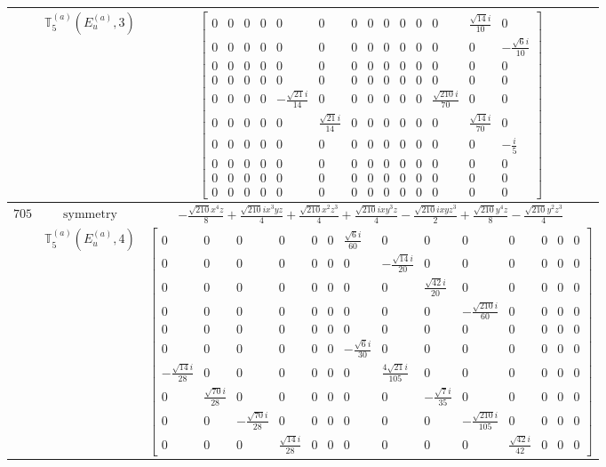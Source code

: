 \documentclass[fleqn,8pt,landscape]{jsarticle}
\begin{document}
\begin{longtable}{ccc}
$  $ & $ \mathbb{T}_{5}^{(a)}(E_{u}^{(a)},3) $ & $ \begin{bmatrix} 0 & 0 & 0 & 0 & 0 & 0 & 0 & 0 & 0 & 0 & 0 & 0 & \frac{\sqrt{14} i}{10} & 0 \\ 0 & 0 & 0 & 0 & 0 & 0 & 0 & 0 & 0 & 0 & 0 & 0 & 0 & - \frac{\sqrt{6} i}{10} \\ 0 & 0 & 0 & 0 & 0 & 0 & 0 & 0 & 0 & 0 & 0 & 0 & 0 & 0 \\ 0 & 0 & 0 & 0 & 0 & 0 & 0 & 0 & 0 & 0 & 0 & 0 & 0 & 0 \\ 0 & 0 & 0 & 0 & - \frac{\sqrt{21} i}{14} & 0 & 0 & 0 & 0 & 0 & 0 & \frac{\sqrt{210} i}{70} & 0 & 0 \\ 0 & 0 & 0 & 0 & 0 & \frac{\sqrt{21} i}{14} & 0 & 0 & 0 & 0 & 0 & 0 & \frac{\sqrt{14} i}{70} & 0 \\ 0 & 0 & 0 & 0 & 0 & 0 & 0 & 0 & 0 & 0 & 0 & 0 & 0 & - \frac{i}{5} \\ 0 & 0 & 0 & 0 & 0 & 0 & 0 & 0 & 0 & 0 & 0 & 0 & 0 & 0 \\ 0 & 0 & 0 & 0 & 0 & 0 & 0 & 0 & 0 & 0 & 0 & 0 & 0 & 0 \\ 0 & 0 & 0 & 0 & 0 & 0 & 0 & 0 & 0 & 0 & 0 & 0 & 0 & 0 \end{bmatrix} $ \\ \hline
$ 705 $ & $ \text{symmetry} $ & $ - \frac{\sqrt{210} x^{4} z}{8} + \frac{\sqrt{210} i x^{3} y z}{4} + \frac{\sqrt{210} x^{2} z^{3}}{4} + \frac{\sqrt{210} i x y^{3} z}{4} - \frac{\sqrt{210} i x y z^{3}}{2} + \frac{\sqrt{210} y^{4} z}{8} - \frac{\sqrt{210} y^{2} z^{3}}{4} $ \\
$  $ & $ \mathbb{T}_{5}^{(a)}(E_{u}^{(a)},4) $ & $ \begin{bmatrix} 0 & 0 & 0 & 0 & 0 & 0 & \frac{\sqrt{6} i}{60} & 0 & 0 & 0 & 0 & 0 & 0 & 0 \\ 0 & 0 & 0 & 0 & 0 & 0 & 0 & - \frac{\sqrt{14} i}{20} & 0 & 0 & 0 & 0 & 0 & 0 \\ 0 & 0 & 0 & 0 & 0 & 0 & 0 & 0 & \frac{\sqrt{42} i}{20} & 0 & 0 & 0 & 0 & 0 \\ 0 & 0 & 0 & 0 & 0 & 0 & 0 & 0 & 0 & - \frac{\sqrt{210} i}{60} & 0 & 0 & 0 & 0 \\ 0 & 0 & 0 & 0 & 0 & 0 & 0 & 0 & 0 & 0 & 0 & 0 & 0 & 0 \\ 0 & 0 & 0 & 0 & 0 & 0 & - \frac{\sqrt{6} i}{30} & 0 & 0 & 0 & 0 & 0 & 0 & 0 \\ - \frac{\sqrt{14} i}{28} & 0 & 0 & 0 & 0 & 0 & 0 & \frac{4 \sqrt{21} i}{105} & 0 & 0 & 0 & 0 & 0 & 0 \\ 0 & \frac{\sqrt{70} i}{28} & 0 & 0 & 0 & 0 & 0 & 0 & - \frac{\sqrt{7} i}{35} & 0 & 0 & 0 & 0 & 0 \\ 0 & 0 & - \frac{\sqrt{70} i}{28} & 0 & 0 & 0 & 0 & 0 & 0 & - \frac{\sqrt{210} i}{105} & 0 & 0 & 0 & 0 \\ 0 & 0 & 0 & \frac{\sqrt{14} i}{28} & 0 & 0 & 0 & 0 & 0 & 0 & \frac{\sqrt{42} i}{42} & 0 & 0 & 0 \end{bmatrix} $ \\ \hline

\end{longtable}
\end{document}
